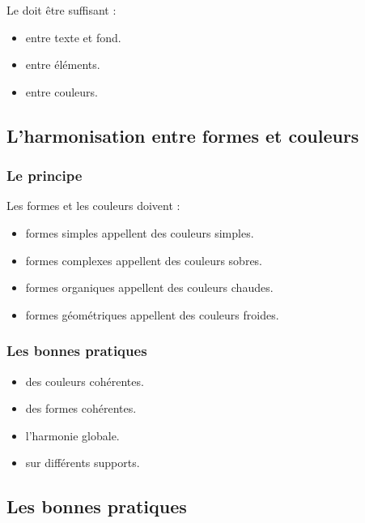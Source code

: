 Le  doit être suffisant :

\begin{itemize}
    \item {} entre texte et fond.
    \item {} entre éléments.
    \item {} entre couleurs.
\end{itemize}

\subsection{L'harmonisation entre formes et couleurs}

\subsubsection{Le principe}

Les formes et les couleurs doivent  :

\begin{itemize}
    \item {} formes simples appellent des couleurs simples.
    \item {} formes complexes appellent des couleurs sobres.
    \item {} formes organiques appellent des couleurs chaudes.
    \item {} formes géométriques appellent des couleurs froides.
\end{itemize}

\subsubsection{Les bonnes pratiques}

\begin{itemize}
    \item {} des couleurs cohérentes.
    \item {} des formes cohérentes.
    \item {} l'harmonie globale.
    \item {} sur différents supports.
\end{itemize}

\subsection{Les bonnes pratiques}

